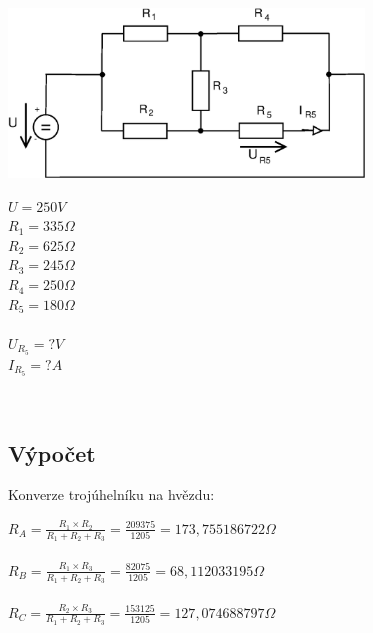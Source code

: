 \documentclass[12pt,a4paper,titlepage,final]{article}
\begin{document}
	\begin{minipage}[c]{0.6\textwidth}
		\includegraphics[height=4.5cm]{img/Pr2_2012.eps}
		\label{fig:pr2_obvod}
	\end{minipage}
	\begin{minipage}[c]{0.25\textwidth}
		$U = 250 V$ \\
		$R_{1} = 335 \Omega$ \\
		$R_{2} = 625 \Omega$ \\
		$R_{3} = 245 \Omega$ \\
		$R_{4} = 250 \Omega$ \\
		$R_{5} = 180 \Omega$ \\
		\\
		$U_{R_{5}} = ? V$ \\
		$I_{R_{5}} = ? A$ \\
	\end{minipage}
	\\


	\subsection*{Výpočet}
	
	Konverze trojúhelníku na hvězdu: \\
	
	\begin{tabbing}
		$ { \displaystyle R_{A} = \frac{R_{1} \times R_{2}} 
		{R_{1} + R_{2} + R_{3}} = 
		\frac{209375}{1205} = 173,755186722 \Omega}$ \\
		\\
		$ { \displaystyle R_{B} = \frac{R_{1} \times R_{3}} 
		{R_{1} + R_{2} + R_{3}} =  
		\frac{82075}{1205} = 68,112033195 \Omega}$ \\
		\\
		$ { \displaystyle R_{C} = \frac{R_{2} \times R_{3}} 
		{R_{1} + R_{2} + R_{3}} = 
		\frac{153125}{1205} = 127,074688797 \Omega}$ \\
		\\
	\end{tabbing}
	
\end{document}
